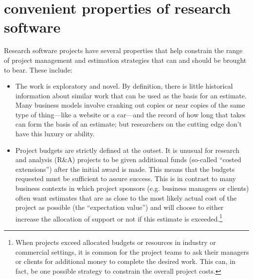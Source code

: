 \documentclass[12pt,oneside]{book}
\begin{document}
\newpage
{}
\section*{convenient properties of research software}
\label{scrivauto:11}

Research software projects have several properties that help constrain the range of project management and estimation strategies that can and should be brought to bear. These include:\
\begin{itemize}[wide, labelwidth=!, labelindent=0pt, font=\bfseries]
\item The work is exploratory and novel. By definition, there is little historical information about similar work that can be used as the basis for an estimate. Many business models involve cranking out copies or near copies of the same type of thing---like a website or a car---and the record of how long that takes can form the basis of an estimate; but researchers on the cutting edge don't have this luxury or ability.
\item Project budgets are strictly defined at the outset. It is unusual for research and analysis (R\&A) projects to be given additional funds (so-called ``costed extensions'') after the initial award is made. This means that the budgets requested must be sufficient to assure success. This is in contrast to many business contexts in which project sponsors (e.g. business managers or clients) often want estimates that are as close to the most likely actual cost of the project as possible (the ``expectation value'') and will choose to either increase the allocation of support or not if this estimate is exceeded.\footnote{When projects exceed allocated budgets or resources in industry or commercial settings, it is common for the project teams to ask their managers or clients for additional money to complete the desired work. This can, in fact, be one possible strategy to constrain the overall project costs.}

\end{itemize}
\end{document}
